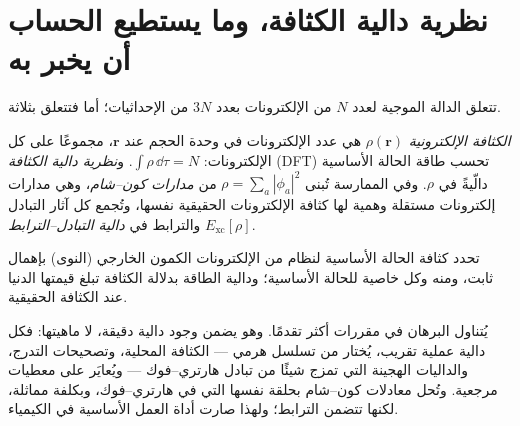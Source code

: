 \section{نظرية دالية الكثافة، وما يستطيع الحساب أن يخبر به}

تتعلق الدالة الموجية لعدد $N$ من الإلكترونات بعدد $3N$ من الإحداثيات؛ أما
 فتتعلق بثلاثة.

\begin{definition}\label{def:b3:computational-chemistry:dft}
\emph{الكثافة الإلكترونية} $\rho(\mathbf r)$ هي
عدد الإلكترونات في وحدة الحجم عند $\mathbf r$، مجموعًا على كل الإلكترونات:
$\int\rho\,\dd\tau = N$. و\emph{نظرية دالية الكثافة}
(DFT) تحسب طاقة الحالة الأساسية دالّيةً في $\rho$. وفي
الممارسة تُبنى $\rho = \sum_a|\phi_a|^2$ من \emph{مدارات
كون--شام}، وهي مدارات إلكترونات مستقلة
وهمية لها كثافة الإلكترونات الحقيقية نفسها، وتُجمع كل آثار
التبادل والترابط في \emph{دالية التبادل--الترابط} $E_{\mathrm{xc}}[\rho]$.
\end{definition}

\begin{theorem}\label{thm:b3:computational-chemistry:hohenberg-kohn}
تحدد كثافة الحالة الأساسية لنظام من الإلكترونات الكمون
الخارجي (النوى) بإهمال ثابت، ومنه  وكل
خاصية للحالة الأساسية؛ ودالية الطاقة بدلالة الكثافة تبلغ
قيمتها الدنيا عند الكثافة الحقيقية.
\end{theorem}
\admitted

يُتناول البرهان في مقررات أكثر تقدمًا. وهو يضمن وجود دالية
دقيقة، لا ماهيتها: فكل دالية عملية
تقريب، يُختار من تسلسل هرمي --- الكثافة المحلية، وتصحيحات
التدرج، والداليات الهجينة التي تمزج شيئًا من تبادل هارتري--فوك --- 
ويُعايَر على معطيات مرجعية. وتُحل معادلات كون--شام بحلقة
 نفسها التي في هارتري--فوك، وبكلفة مماثلة، لكنها تتضمن الترابط؛
ولهذا صارت  أداة العمل الأساسية في الكيمياء.

